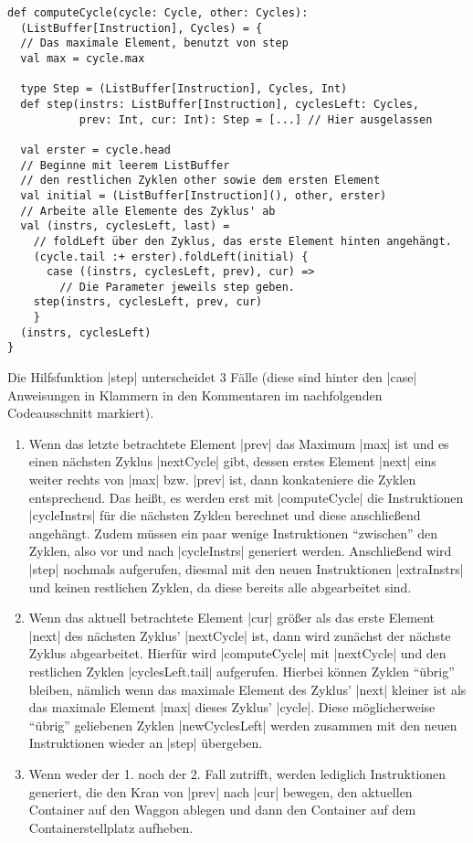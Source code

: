 \begin{lstlisting}
def computeCycle(cycle: Cycle, other: Cycles):
  (ListBuffer[Instruction], Cycles) = {
  // Das maximale Element, benutzt von step
  val max = cycle.max

  type Step = (ListBuffer[Instruction], Cycles, Int)
  def step(instrs: ListBuffer[Instruction], cyclesLeft: Cycles,
           prev: Int, cur: Int): Step = [...] // Hier ausgelassen

  val erster = cycle.head
  // Beginne mit leerem ListBuffer
  // den restlichen Zyklen other sowie dem ersten Element
  val initial = (ListBuffer[Instruction](), other, erster)
  // Arbeite alle Elemente des Zyklus' ab
  val (instrs, cyclesLeft, last) =
    // foldLeft über den Zyklus, das erste Element hinten angehängt.
    (cycle.tail :+ erster).foldLeft(initial) {
      case ((instrs, cyclesLeft, prev), cur) =>
        // Die Parameter jeweils step geben.
	step(instrs, cyclesLeft, prev, cur)
    }
  (instrs, cyclesLeft)
}
\end{lstlisting}
\lstset{basicstyle=\ttfamily}
Die Hilfsfunktion |step| unterscheidet 3 Fälle (diese sind hinter den |case| Anweisungen in Klammern in den Kommentaren im nachfolgenden Codeausschnitt markiert).
\begin{enumerate}
 \item Wenn das letzte betrachtete Element |prev| das Maximum |max| ist und es einen nächsten Zyklus |nextCycle| gibt,
       dessen erstes Element |next| eins weiter rechts von |max| bzw. |prev| ist, dann konkateniere die Zyklen entsprechend.
       Das heißt, es werden erst mit |computeCycle| die Instruktionen |cycleInstrs| für die nächsten Zyklen berechnet
       und diese anschließend angehängt. Zudem müssen ein paar wenige Instruktionen ``zwischen'' den Zyklen,
       also vor und nach |cycleInstrs| generiert werden. Anschließend wird |step| nochmals aufgerufen,
       diesmal mit den neuen Instruktionen |extraInstrs| und keinen restlichen Zyklen, da diese bereits alle abgearbeitet sind.
 \item Wenn das aktuell betrachtete Element |cur| größer als das erste Element |next| des nächsten Zyklus' |nextCycle| ist,
       dann wird zunächst der nächste Zyklus abgearbeitet.
       Hierfür wird |computeCycle| mit |nextCycle| und den restlichen Zyklen |cyclesLeft.tail| aufgerufen.
       Hierbei können Zyklen ``übrig'' bleiben,
       nämlich wenn das maximale Element des Zyklus' |next| kleiner ist als das maximale Element |max| dieses Zyklus' |cycle|.
       Diese möglicherweise ``übrig'' geliebenen Zyklen |newCyclesLeft| werden zusammen mit den neuen Instruktionen wieder an |step| übergeben.
 \item Wenn weder der 1. noch der 2. Fall zutrifft, werden lediglich Instruktionen generiert,
       die den Kran von |prev| nach |cur| bewegen, den aktuellen Container auf den Waggon ablegen und dann den Container auf dem Containerstellplatz aufheben.
\end{enumerate}
